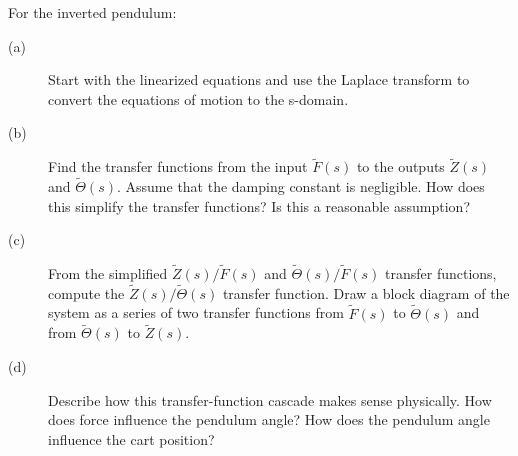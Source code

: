  For the inverted pendulum:
  \begin{description}
    \item[(a)] Start with the linearized equations and use the Laplace transform to convert the equations of motion to the s-domain. 
    \item[(b)] Find the transfer functions from the input $\tilde{F}(s)$ to the outputs $\tilde{Z}(s)$ and $\tilde{\Theta}(s)$. Assume that the damping constant is negligible. How does this simplify the transfer functions? Is this a reasonable assumption?
    \item[(c)] From the simplified $\tilde{Z}(s)/\tilde{F}(s)$ and $\tilde{\Theta}(s)/\tilde{F}(s)$ transfer functions, compute the $\tilde{Z}(s)/\tilde{\Theta}(s)$ transfer function. Draw a block diagram of the system as a series of two transfer functions from $\tilde{F}(s)$ to $\tilde{\Theta}(s)$ and from $\tilde{\Theta}(s)$ to $\tilde{Z}(s)$.
    \item[(d)] Describe how this transfer-function cascade makes sense physically. How does force influence the pendulum angle? How does the pendulum angle influence the cart position?
  \end{description}
